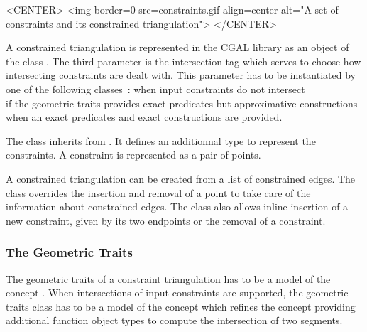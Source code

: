 \begin{ccTexOnly}
\begin{center}   \end{center}
\end{ccTexOnly}
 
\begin{ccHtmlOnly}
<CENTER>
<img border=0 src=constraints.gif align=center alt="A set of
constraints and its constrained triangulation">
</CENTER>
\end{ccHtmlOnly}

A constrained triangulation is represented in the CGAL library as an
object of the class .
The third parameter  is the intersection tag
which serves to choose how intersecting constraints
are dealt with. This parameter has to be instantiated
by one of the following classes~:
 when input constraints do not
intersect \\
 if the geometric traits provides
exact predicates but approximative constructions \\
 when an exact predicates
and exact constructions are provided.

The class 
inherits from .
It defines an additionnal type 
to represent the constraints. A
constraint is represented as a pair of points.

A  constrained triangulation can be created
from a
list of constrained edges.
The class 
overrides the insertion and removal of a point to take care of the
information about constrained edges. The class also allows inline
insertion of a new constraint, given by its two endpoints
or the removal of a constraint.

\subsubsection{The Geometric Traits}
The geometric traits of a constraint triangulation
 has to be a model
of the concept .
When intersections of input constraints are supported, 
the geometric traits class has to be a model 
of the concept 
which refines the concept 
providing  additional function object types
to compute the intersection of two segments.

